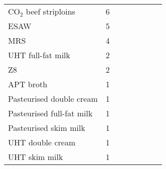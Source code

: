 \documentclass[11pt]{article}
\newcommand{\subsc}[1]{\ensuremath{_{\textrm{#1}}}}
\begin{document}
\begin{table}[htbp]
\begin{tabularx}{\linewidth}{l*{7}{c}}
			CO\subsc{2} beef striploins & 6 \\
			ESAW & 5 \\
			MRS & 4 \\
			UHT full-fat milk & 2 \\
			Z8 & 2 \\
			APT broth & 1 \\
			Pasteurised double cream & 1 \\
			Pasteurised full-fat milk & 1 \\
			Pasteurised skim milk & 1 \\
			UHT double cream & 1 \\
			UHT skim milk & 1 \\
			\bottomrule
		\end{tabularx}
	\end{table}
	
\end{document}
